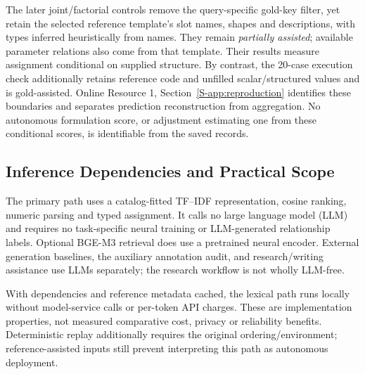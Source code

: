 \documentclass[pdflatex,iicol,sn-basic,Numbered]{sn-jnl}
\begin{document}
The later joint/factorial controls remove the query-specific gold-key filter, yet retain the selected reference template's slot names, shapes and descriptions, with types inferred heuristically from names. They remain \emph{partially assisted}; available parameter relations also come from that template. Their results measure assignment conditional on supplied structure. By contrast, the 20-case execution check additionally retains reference code and unfilled scalar/structured values and is gold-assisted. Online Resource 1, Section~\ref{S-app:reproduction} identifies these boundaries and separates prediction reconstruction from aggregation. No autonomous formulation score, or adjustment estimating one from these conditional scores, is identifiable from the saved records.

\subsection{Inference Dependencies and Practical Scope}
\label{subsec:inference-dependencies}

The primary path uses a catalog-fitted TF--IDF representation, cosine ranking, numeric parsing and typed assignment. It calls no large language model (LLM) and requires no task-specific neural training or LLM-generated relationship labels. Optional BGE-M3 retrieval does use a pretrained neural encoder. External generation baselines, the auxiliary annotation audit, and research/writing assistance use LLMs separately; the research workflow is not wholly LLM-free.

With dependencies and reference metadata cached, the lexical path runs locally without model-service calls or per-token API charges. These are implementation properties, not measured comparative cost, privacy or reliability benefits. Deterministic replay additionally requires the original ordering/environment; reference-assisted inputs still prevent interpreting this path as autonomous deployment.
\end{document}
